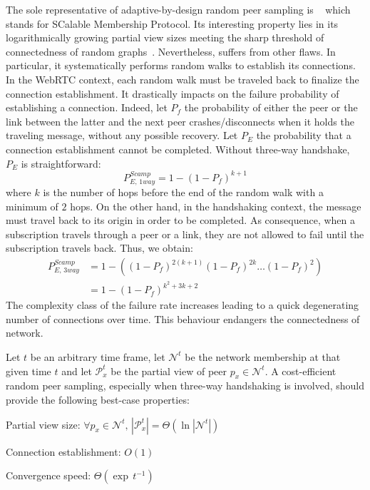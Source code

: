 The sole representative of adaptive-by-design random peer sampling is
\SCAMP{}~\cite{ganesh2001scamp,ganesh2003peer} which stands for SCalable
Membership Protocol. Its interesting property lies in its logarithmically
growing partial view sizes meeting the sharp threshold of connectedness of
random graphs~\cite{erdos1959random}. Nevertheless, \SCAMP{} suffers from other
flaws. In particular, it systematically performs random walks to establish its
connections. In the WebRTC context, each random walk must be traveled back to
finalize the connection establishment. It drastically impacts on the \SCAMP{}
failure probability of establishing a connection. Indeed, let $P_f$ the
probability of either the peer or the link between the latter and the next peer
crashes/disconnects when it holds the traveling message, without any possible
recovery. Let $P_E$ the probability that a connection establishment cannot be
completed. Without three-way handshake, $P_E$ is straightforward:
\begin{equation} P_{E,\,1way}^{Scamp}=1-(1- P_f)^{k+1} \end{equation} where $k$
is the number of hops before the end of the random walk with a minimum of $2$
hops. On the other hand, in the handshaking context, the message must travel
back to its origin in order to be completed. As consequence, when a
subscription travels through a peer or a link, they are not allowed to fail
until the subscription travels back. Thus, we obtain:
\begin{align} P_{E,\,3way}^{Scamp} &=1 - ((1-P_f)^{2(k+1)} (1-P_f)^{2k}
                                     \ldots (1-P_f)^2) \nonumber \\
                                   &=1-(1-P_f)^{k^2+3k+2}
\end{align}
The complexity class of the \SCAMP{} failure rate increases leading to a quick
degenerating number of connections over time. This behaviour endangers the
connectedness of network.

\begin{problem}
  Let $t$ be an arbitrary time frame, let $\mathcal{N}^t$ be the network
  membership at that given time $t$ and let $\mathcal{P}_x^t$ be the partial
  view of peer $p_x \in \mathcal{N}^t$.  A cost-efficient random peer sampling,
  especially when three-way handshaking is involved, should provide the
  following best-case properties:
  \begin{center}
    Partial view size: \hfill
    $\forall p_x \in \mathcal{N}^t,\, |\mathcal{P}_x^t| = \Theta (\ln
    |\mathcal{N}^t|)$
  \end{center}
  \begin{center}
    Connection establishment: \hfill $O(1)$
  \end{center}
  \begin{center}
    Convergence speed: \hfill $\Theta(\exp \, t^{-1})$
  \end{center}
\end{problem}


